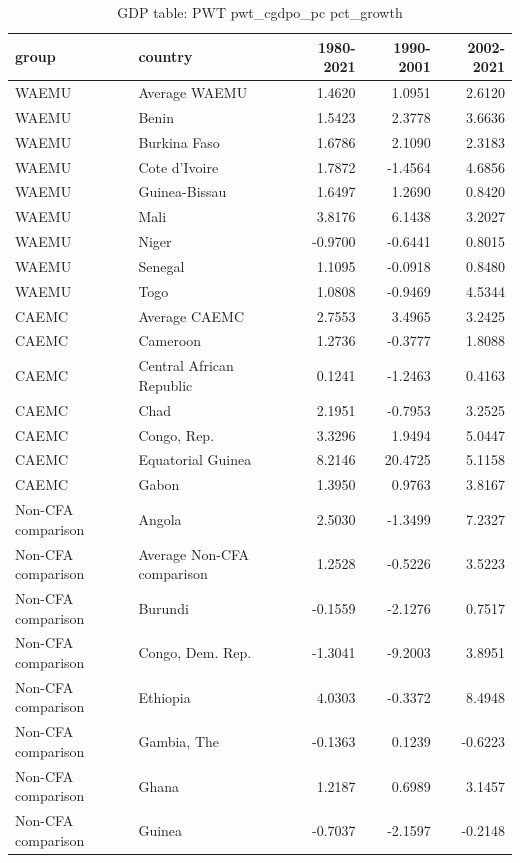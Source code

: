 \begin{table}

\caption{GDP table: PWT pwt_cgdpo_pc pct_growth}
\centering
\begin{tabular}[t]{llrrr}
\toprule
group & country & 1980-2021 & 1990-2001 & 2002-2021\\
\midrule
WAEMU & Average WAEMU & 1.4620 & 1.0951 & 2.6120\\
WAEMU & Benin & 1.5423 & 2.3778 & 3.6636\\
WAEMU & Burkina Faso & 1.6786 & 2.1090 & 2.3183\\
WAEMU & Cote d'Ivoire & 1.7872 & -1.4564 & 4.6856\\
WAEMU & Guinea-Bissau & 1.6497 & 1.2690 & 0.8420\\
\addlinespace
WAEMU & Mali & 3.8176 & 6.1438 & 3.2027\\
WAEMU & Niger & -0.9700 & -0.6441 & 0.8015\\
WAEMU & Senegal & 1.1095 & -0.0918 & 0.8480\\
WAEMU & Togo & 1.0808 & -0.9469 & 4.5344\\
CAEMC & Average CAEMC & 2.7553 & 3.4965 & 3.2425\\
\addlinespace
CAEMC & Cameroon & 1.2736 & -0.3777 & 1.8088\\
CAEMC & Central African Republic & 0.1241 & -1.2463 & 0.4163\\
CAEMC & Chad & 2.1951 & -0.7953 & 3.2525\\
CAEMC & Congo, Rep. & 3.3296 & 1.9494 & 5.0447\\
CAEMC & Equatorial Guinea & 8.2146 & 20.4725 & 5.1158\\
\addlinespace
CAEMC & Gabon & 1.3950 & 0.9763 & 3.8167\\
Non-CFA comparison & Angola & 2.5030 & -1.3499 & 7.2327\\
Non-CFA comparison & Average Non-CFA comparison & 1.2528 & -0.5226 & 3.5223\\
Non-CFA comparison & Burundi & -0.1559 & -2.1276 & 0.7517\\
Non-CFA comparison & Congo, Dem. Rep. & -1.3041 & -9.2003 & 3.8951\\
\addlinespace
Non-CFA comparison & Ethiopia & 4.0303 & -0.3372 & 8.4948\\
Non-CFA comparison & Gambia, The & -0.1363 & 0.1239 & -0.6223\\
Non-CFA comparison & Ghana & 1.2187 & 0.6989 & 3.1457\\
Non-CFA comparison & Guinea & -0.7037 & -2.1597 & -0.2148\\

\end{tabular}
\end{table}
